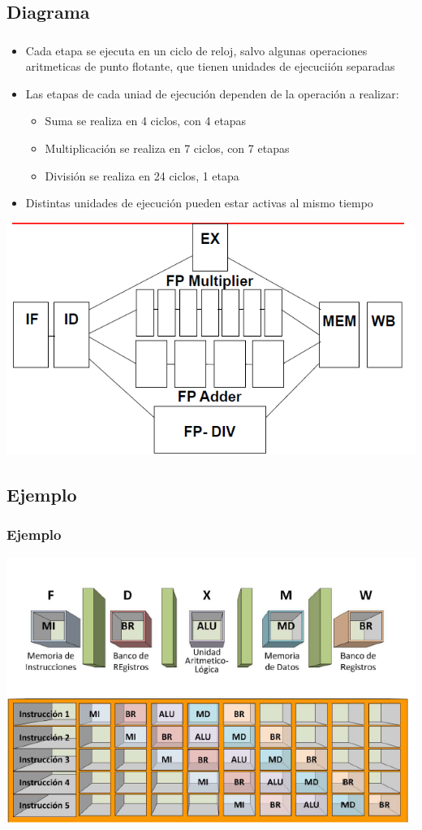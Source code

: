 \documentclass{beamer}
\begin{document}
\subsection{Diagrama}
\begin{frame}
\frametitle{}
\begin{itemize}
\item Cada etapa se ejecuta en un ciclo de reloj, salvo algunas operaciones aritmeticas de punto flotante, que tienen unidades de ejecuciión separadas
\item Las etapas de cada uniad de ejecución dependen de la operación a realizar:
\begin{itemize}
\item Suma se realiza en 4 ciclos, con 4 etapas
\item Multiplicación se realiza en 7 ciclos, con 7 etapas
\item División se realiza en 24 ciclos, 1 etapa
\end{itemize}
\item Distintas unidades de ejecución pueden estar activas al mismo tiempo
\end{itemize}
\includegraphics[scale=0.35]{ciclo-instruccion.png}
\end{frame}

\subsection{Ejemplo}
\begin{frame}
\frametitle{Ejemplo}
\includegraphics[scale=0.45]{ejemplo-segmentacion.png}
\end{frame}
\end{document}
